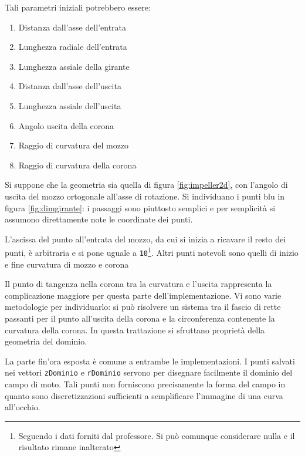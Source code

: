 \documentclass{tufte-handout}
\begin{document}
Tali parametri iniziali potrebbero essere:
\begin{enumerate}
    \item Distanza dall'asse dell'entrata
    \item Lunghezza radiale dell'entrata
    \item Lunghezza assiale della girante
    \item Distanza dall'asse dell'uscita
    \item Lunghezza assiale dell'uscita
    \item Angolo uscita della corona
    \item Raggio di curvatura del mozzo
    \item Raggio di curvatura della corona
\end{enumerate}

Si suppone che la geometria sia quella di figura \ref{fig:impeller2d}, con l'angolo
di uscita del mozzo ortogonale all'asse di rotazione.
Si individuano i punti blu in figura \ref{fig:dimgirante}: i passaggi sono piuttosto semplici
e per semplicità si assumono direttamente note le coordinate dei punti. 

L'ascissa del punto all'entrata del mozzo, da cui si inizia a ricavare il resto dei punti,
è arbitraria e si pone uguale a \texttt{10}\footnote{Seguendo i dati forniti dal professore. Si può comunque considerare nulla e il risultato rimane inalterato}.
Altri punti notevoli sono quelli di inizio e fine curvatura di mozzo e corona


Il punto di tangenza nella corona tra la curvatura
e l'uscita rappresenta la complicazione maggiore per questa parte dell'implementazione.
Vi sono varie metodologie per individuarlo: si può risolvere un sistema tra il fascio di rette
passanti per il punto all'uscita della corona e la circonferenza contenente la curvatura della
corona.
In questa trattazione si sfruttano proprietà della geometria del dominio.



La parte fin'ora esposta è comune a entrambe le implementazioni.
I punti salvati nei vettori \texttt{zDominio} e \texttt{rDominio} servono per disegnare
facilmente il dominio del campo di moto. Tali punti non forniscono precisamente la forma
del campo in quanto sono discretizzazioni sufficienti a semplificare l'immagine di una curva
all'occhio.
\end{document}
